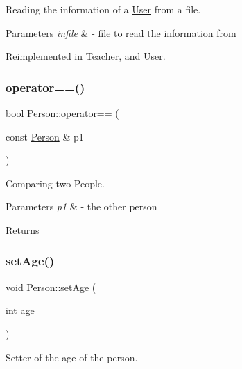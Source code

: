 Reading the information of a \mbox{\hyperlink{class_user}{User}} from a file. 


\begin{DoxyParams}{Parameters}
{\em infile} & -\/ file to read the information from \\
\hline
\end{DoxyParams}


Reimplemented in \mbox{\hyperlink{class_teacher_a1f204644af41c43ff3bd0582393062fa}{Teacher}}, and \mbox{\hyperlink{class_user_abc12a9ca668bd860a3d6d2ae4791997d}{User}}.

\mbox{\label{class_person_aa2fe338cbcf08ee5981dce811fd3a50a}} 
\subsubsection{\texorpdfstring{operator==()}{operator==()}}
{\footnotesize\ttfamily bool Person\+::operator== (\begin{DoxyParamCaption}\item[{const \mbox{\hyperlink{class_person}{Person}} \&}]{p1 }\end{DoxyParamCaption})}



Comparing two People. 


\begin{DoxyParams}{Parameters}
{\em p1} & -\/ the other person \\
\hline
\end{DoxyParams}
\begin{DoxyReturn}{Returns}

\end{DoxyReturn}
\mbox{\label{class_person_ac8ade54c27a0657c987c395ff04a9d46}} 
\subsubsection{\texorpdfstring{set\+Age()}{setAge()}}
{\footnotesize\ttfamily void Person\+::set\+Age (\begin{DoxyParamCaption}\item[{int}]{age }\end{DoxyParamCaption})}



Setter of the age of the person. 


